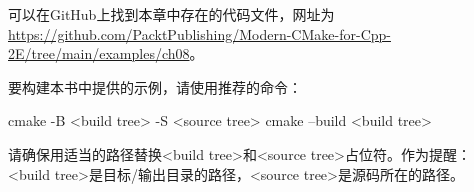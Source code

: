 可以在GitHub上找到本章中存在的代码文件，网址为 \url{https://github.com/PacktPublishing/Modern-CMake-for-Cpp-2E/tree/main/examples/ch08}。

要构建本书中提供的示例，请使用推荐的命令：

\begin{shell}
cmake -B <build tree> -S <source tree>
cmake --build <build tree>
\end{shell}

请确保用适当的路径替换<build tree>和<source tree>占位符。作为提醒：<build tree>是目标/输出目录的路径，<source tree>是源码所在的路径。

























